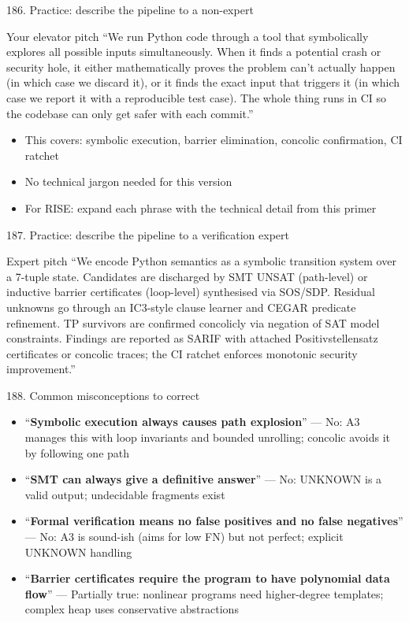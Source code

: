 \documentclass[aspectratio=169]{beamer}
\begin{document}
\begin{frame}{186. Practice: describe the pipeline to a non-expert}
\begin{block}{Your elevator pitch}
``We run Python code through a tool that symbolically explores all possible inputs simultaneously.
When it finds a potential crash or security hole, it either mathematically proves the problem can't
actually happen (in which case we discard it), or it finds the exact input that triggers it (in which
case we report it with a reproducible test case). The whole thing runs in CI so the codebase can
only get safer with each commit.''
\end{block}
\begin{itemize}
  \item This covers: symbolic execution, barrier elimination, concolic confirmation, CI ratchet
  \item No technical jargon needed for this version
  \item For RISE: expand each phrase with the technical detail from this primer
\end{itemize}
\end{frame}

\begin{frame}{187. Practice: describe the pipeline to a verification expert}
\begin{block}{Expert pitch}
``We encode Python semantics as a symbolic transition system over a 7-tuple state.
Candidates are discharged by SMT UNSAT (path-level) or inductive barrier certificates (loop-level)
synthesised via SOS/SDP. Residual unknowns go through an IC3-style clause learner and CEGAR predicate
refinement. TP survivors are confirmed concolicly via negation of SAT model constraints. Findings
are reported as SARIF with attached Positivstellensatz certificates or concolic traces; the CI
ratchet enforces monotonic security improvement.''
\end{block}
\end{frame}

\begin{frame}{188. Common misconceptions to correct}
\begin{itemize}
  \item ``\textbf{Symbolic execution always causes path explosion}'' --- No: A3 manages this with loop invariants and bounded unrolling; concolic avoids it by following one path
  \item ``\textbf{SMT can always give a definitive answer}'' --- No: UNKNOWN is a valid output; undecidable fragments exist
  \item ``\textbf{Formal verification means no false positives and no false negatives}'' --- No: A3 is sound-ish (aims for low FN) but not perfect; explicit UNKNOWN handling
  \item ``\textbf{Barrier certificates require the program to have polynomial data flow}'' --- Partially true: nonlinear programs need higher-degree templates; complex heap uses conservative abstractions
\end{itemize}
\end{frame}
\end{document}
